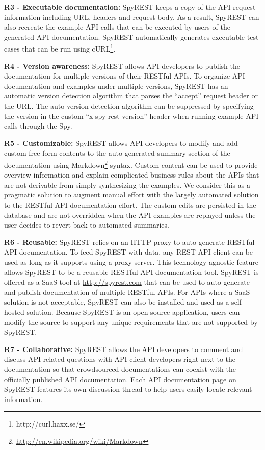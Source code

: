 \documentclass[conference]{IEEEtran}
\begin{document}
\textbf{R3 -  Executable documentation:} SpyREST keeps a copy of the API request information including URL, headers and request body. As a result, SpyREST can also recreate the example API calls that can be executed by users of the generated API documentation. SpyREST automatically generates executable test cases that can be run using cURL\footnote{http://curl.haxx.se/}.

\textbf{R4 - Version awareness:} SpyREST allows API developers to publish the documentation for multiple versions of their RESTful APIs. To organize API documentation and examples under multiple versions, SpyREST has an automatic version detection algorithm that parses the ``accept'' request header or the URL. The auto version detection algorithm can be suppressed by specifying the version in the custom ``x-spy-rest-version'' header when running example API calls through the Spy.

\textbf{R5 - Customizable:} SpyREST allows API developers to modify and add custom free-form contents to the auto generated summary section of the documentation using Markdown\footnote{\url{http://en.wikipedia.org/wiki/Markdown}} syntax. Custom content can be used to provide overview information and explain complicated business rules about the APIs that are not derivable from simply synthesizing the examples. We consider this as a pragmatic solution to augment manual effort with the largely automated solution to the RESTful API documentation effort. The custom edits are persisted in the database and are not overridden when the API examples are replayed unless the user decides to revert back to automated summaries.

\textbf{R6 - Reusable:} SpyREST relies on an HTTP proxy to auto generate RESTful API documentation. To feed SpyREST with data, any REST API client can be used as long as it supports using a proxy server. This technology agnostic feature allows SpyREST to be a reusable RESTful API documentation tool. SpyREST is offered as a SaaS tool at \url{http://spyrest.com} that can be used to auto-generate and publish documentation of multiple RESTful APIs. For APIs where a SaaS solution is not acceptable, SpyREST can also be installed and used as a self-hosted solution. Because SpyREST is an open-source application, users can modify the source to support any unique requirements that are not supported by SpyREST.

\textbf{R7 - Collaborative:} SpyREST allows the API developers to comment and discuss API related questions with API client developers right next to the documentation so that crowdsourced documentations can coexist with the officially published API documentation. Each API documentation page on SpyREST features its own discussion thread to help users easily locate relevant information.
\end{document}
